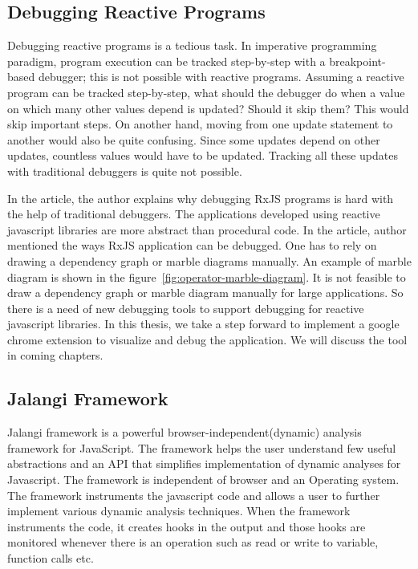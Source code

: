 \subsection{Debugging Reactive Programs}
Debugging reactive programs is a tedious task. In imperative programming paradigm, program execution can be tracked step-by-step with a breakpoint-based debugger; this is not possible with reactive programs. Assuming a reactive program can be tracked step-by-step, what should the debugger do when a value on which many other values depend is updated? Should it skip them? This would skip important steps. On another hand, moving from one update statement to another would also be quite confusing. Since some updates depend on other updates, countless values would have to be updated. Tracking all these updates with traditional debuggers is quite not possible.

In the article\cite{debugRxJS}, the author explains why debugging RxJS programs is hard with the help of traditional debuggers. The applications developed using reactive javascript libraries are more abstract than procedural code. In the article, author mentioned the ways RxJS application can be debugged. One has to rely on drawing a dependency graph or marble diagrams manually. An example of marble diagram is shown in the figure~\ref{fig:operator-marble-diagram}. It is not feasible to draw a dependency graph or marble diagram manually for large applications. So there is a need of new debugging tools to support debugging for reactive javascript libraries. In this thesis, we take a step forward to implement a google chrome extension to visualize and debug the application. We will discuss the tool in coming chapters.

\subsection{Jalangi Framework}
Jalangi framework\cite{Sen:2013:JSR:2491411.2491447} is a powerful    browser-independent(dynamic) analysis framework for JavaScript. The framework helps the user understand few useful abstractions and an API that simplifies implementation of dynamic analyses for Javascript. The framework is independent of browser and an Operating system. The framework instruments the javascript code and allows a user to further implement various dynamic analysis techniques. When the framework instruments the code, it creates hooks in the output and those hooks are monitored whenever there is an operation such as read or write to variable, function calls etc.


